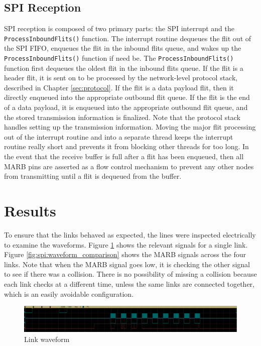 \subsection{SPI Reception}\label{sec:spi:implementation:reception}

SPI reception is composed of two primary parts: the SPI interrupt and the \lstinline$ProcessInboundFlits()$ function. The interrupt routine dequeues the flit out of the SPI FIFO, enqueues the flit in the inbound flits queue, and wakes up the \lstinline$ProcessInboundFlits()$ function if need be. The \lstinline$ProcessInboundFlits()$ function first dequeues the oldest flit in the inbound flits queue. If the flit is a header flit, it is sent on to be processed by the network-level protocol stack, described in Chapter \ref{sec:protocol}. If the flit is a data payload flit, then it directly enqueued into the appropriate outbound flit queue. If the flit is the end of a data payload, it is enqueued into the appropriate outbound flit queue, and the stored transmission information is finalized. Note that the protocol stack handles setting up the transmission information. Moving the major flit processing out of the interrupt routine and into a separate thread keeps the interrupt routine really short and prevents it from blocking other threads for too long. In the event that the receive buffer is full after a flit has been enqueued, then all MARB pins are asserted as a flow control mechanism to prevent any other nodes from transmitting until a flit is dequeued from the buffer.

\section{Results}\label{sec:spi:results}

To ensure that the links behaved as expected, the lines were inspected electrically to examine the waveforms. Figure \ref{fig:spi:link_waveform} shows the relevant signals for a single link. Figure \ref{fig:spi:waveform_comparison} shows the MARB signals across the four links. Note that when the MARB signal goes low, it is checking the other signal to see if there was a collision. There is no possibility of missing a collision because each link checks at a different time, unless the same links are connected together, which is an easily avoidable configuration.

\begin{landscape}
	\begin{figure}[p]
		\begin{centering}
			\includegraphics[width=8.5in]{SPI/Figures/spi-link_waveform.png}
			\caption{Link waveform}
			\label{fig:spi:link_waveform}
		\end{centering}
	\end{figure}
\end{landscape}

